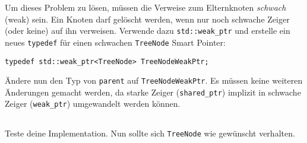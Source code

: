 Um dieses Problem zu lösen, müssen die Verweise zum Elternknoten \emph{schwach} (weak) sein.
Ein Knoten darf gelöscht werden, wenn nur noch schwache Zeiger (oder keine) auf ihn verweisen.
Verwende dazu \texttt{std::weak\_ptr} und erstelle ein neues \texttt{typedef} für einen schwachen \texttt{TreeNode} Smart Pointer:

\begin{lstlisting}
typedef std::weak_ptr<TreeNode> TreeNodeWeakPtr;
\end{lstlisting}

Ändere nun den Typ von \texttt{parent} auf \texttt{TreeNodeWeakPtr}.
Es müssen keine weiteren Änderungen gemacht werden, da starke Zeiger (\texttt{shared\_ptr}) implizit in schwache Zeiger (\texttt{weak\_ptr}) umgewandelt werden können.


\subsection{}
Teste deine Implementation.
Nun sollte sich \texttt{TreeNode} wie gewünscht verhalten.
